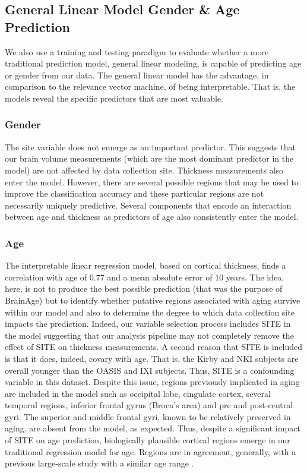 \subsection{General Linear Model Gender \& Age Prediction} 
We also use a training and testing paradigm to evaluate whether a more
traditional prediction model, general linear modeling, is capable of
predicting age or gender from our data.  The general linear model has
the advantage, in comparison to the relevance vector machine, of being
interpretable.  That is, the models reveal the specific predictors
that are most valuable.  

\subsubsection{Gender} 
The site variable does not emerge as an important predictor.  This
suggests that our brain volume measurements (which are the most
dominant predictor in the model) are not affected by data collection
site.  Thickness measurements also enter the model.  However, there
are several possible regions that may be used to improve the
classification accuracy and these particular regions are not
necessarily uniquely predictive.  Several components that encode an
interaction between age and thickness as predictors of age also
consistently enter the model.  

\subsubsection{Age} 
The interpretable linear regression model, based on cortical
thickness, finds a correlation with age of 0.77 and a mean absolute
error of 10 years.  The idea, here, is not to produce the best
possible prediction (that was the purpose of BrainAge) but to identify
whether putative regions associated with aging survive within our
model and also to determine the degree to which data collection site
impacts the prediction.  Indeed, our variable selection process
includes SITE in the model suggesting that our analysis pipeline
may not completely remove the effect of SITE on thickness
measurements.  A second reason that SITE is included is that it does,
indeed, covary with age.  That is, the Kirby and NKI subjects are
overall younger than the OASIS and IXI subjects.  Thus, SITE is a
confounding variable in this dataset.  Despite this issue, regions
previously implicated in aging are included in the model such as
occipital lobe, cingulate cortex, several temporal regions, inferior
frontal gyrus (Broca's area) and pre and post-central gyri.  The
superior and middle frontal gyri, known to be relatively preserved in
aging, are absent from the model, as expected.  Thus, despite a
significant impact of SITE on age prediction, biologically plausible
cortical regions emerge in our traditional regression model for age.  
Regions are in agreement, generally, with a
previous large-scale study with a similar age range
\cite{Groves2012}. 


